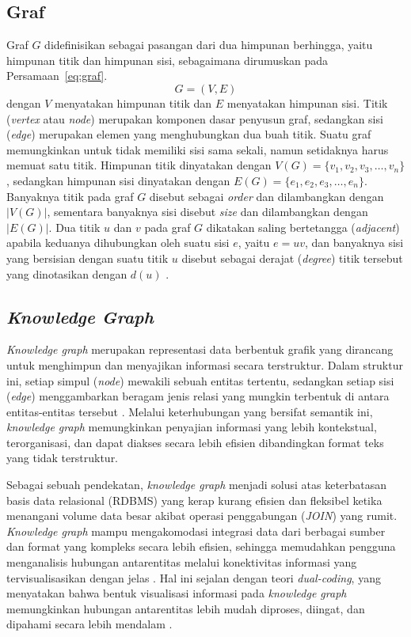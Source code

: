 \subsection{Graf}
Graf $G$ didefinisikan sebagai pasangan dari dua himpunan berhingga, yaitu himpunan titik dan himpunan sisi, sebagaimana dirumuskan pada Persamaan~\eqref{eq:graf}.
\begin{equation}
G = (V, E)
\label{eq:graf}
\end{equation}
dengan $V$ menyatakan himpunan titik dan $E$ menyatakan himpunan sisi.
Titik (\textit{vertex} atau \textit{node}) merupakan komponen dasar penyusun graf, sedangkan sisi (\textit{edge}) merupakan elemen yang menghubungkan dua buah titik.
Suatu graf memungkinkan untuk tidak memiliki sisi sama sekali, namun setidaknya harus memuat satu titik. Himpunan titik dinyatakan dengan $V(G) = \{v_1, v_2, v_3, \dots, v_n\}$, sedangkan himpunan sisi dinyatakan dengan $E(G) = \{e_1, e_2, e_3, \dots, e_n\}$. 
Banyaknya titik pada graf $G$ disebut sebagai \textit{order} dan dilambangkan dengan $|V(G)|$, sementara banyaknya sisi disebut \textit{size} dan dilambangkan dengan $|E(G)|$. 
Dua titik $u$ dan $v$ pada graf $G$ dikatakan saling bertetangga (\textit{adjacent}) apabila keduanya dihubungkan oleh suatu sisi $e$, yaitu $e = uv$, dan banyaknya sisi yang bersisian dengan suatu titik $u$ disebut sebagai derajat (\textit{degree}) titik tersebut yang dinotasikan dengan $d(u)$ \cite{Lestari_Kristiana_Prihandini_Alfarisi_Setiawan_Adawiyah_2024}.

\subsection{\textit{Knowledge Graph}}
\textit{Knowledge graph} merupakan representasi data berbentuk grafik yang dirancang untuk menghimpun dan menyajikan informasi secara terstruktur. Dalam struktur ini, setiap simpul (\textit{node}) mewakili sebuah entitas tertentu, sedangkan setiap sisi (\textit{edge}) menggambarkan beragam jenis relasi yang mungkin terbentuk di antara entitas-entitas tersebut \cite{Yusrianda2025}. 
Melalui keterhubungan yang bersifat semantik ini, \textit{knowledge graph} memungkinkan penyajian informasi yang lebih kontekstual, terorganisasi, dan dapat diakses secara lebih efisien dibandingkan format teks yang tidak terstruktur.

Sebagai sebuah pendekatan, \textit{knowledge graph} menjadi solusi atas keterbatasan basis data relasional (RDBMS) yang kerap kurang efisien dan fleksibel ketika menangani volume data besar akibat operasi penggabungan (\textit{JOIN}) yang rumit. 
\textit{Knowledge graph} mampu mengakomodasi integrasi data dari berbagai sumber dan format yang kompleks secara lebih efisien, sehingga memudahkan pengguna menganalisis hubungan antarentitas melalui konektivitas informasi yang tervisualisasikan dengan jelas \cite{Prataba_Putra_Widodo_2024}. 
Hal ini sejalan dengan teori \textit{dual-coding}, yang menyatakan bahwa bentuk visualisasi informasi pada \textit{knowledge graph} memungkinkan hubungan antarentitas lebih mudah diproses, diingat, dan dipahami secara lebih mendalam \cite{Prataba_Putra_Widodo_2024}.

